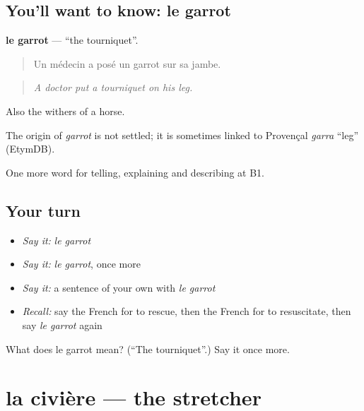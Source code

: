 \subsection*{You'll want to know: le garrot}
\textbf{le garrot} — \textquotedblleft{}the tourniquet\textquotedblright{}.

\begin{quote}
Un médecin a posé un garrot sur sa jambe.
\end{quote}

\begin{quote}
\emph{A doctor put a tourniquet on his leg.}
\end{quote}

Also the withers of a horse.

\begin{cousinweb}
The origin of \emph{garrot} is not settled; it is sometimes linked to Provençal \emph{garra} \textquotedblleft{}leg\textquotedblright{} (EtymDB).
\end{cousinweb}

\begin{grammarlens}[title={What you've built}]
One more word for telling, explaining and describing at B1.
\end{grammarlens}

\subsection*{Your turn}
\begin{itemize}
\raggedright
  \item \emph{Say it:} \emph{le garrot}
  \item \emph{Say it:} \emph{le garrot}, once more
  \item \emph{Say it:} a sentence of your own with \emph{le garrot}
  \item \emph{Recall:} say the French for to rescue, then the French for to resuscitate, then say \emph{le garrot} again
\end{itemize}

\begin{tcolorbox}[breakable,colback=teal!4,colframe=teal!35!black,title={Before you move on}]
What does le garrot mean? (\textquotedblleft{}The tourniquet\textquotedblright{}.) Say it once more.
\end{tcolorbox}
\section[la civière]{la civière — the stretcher}

